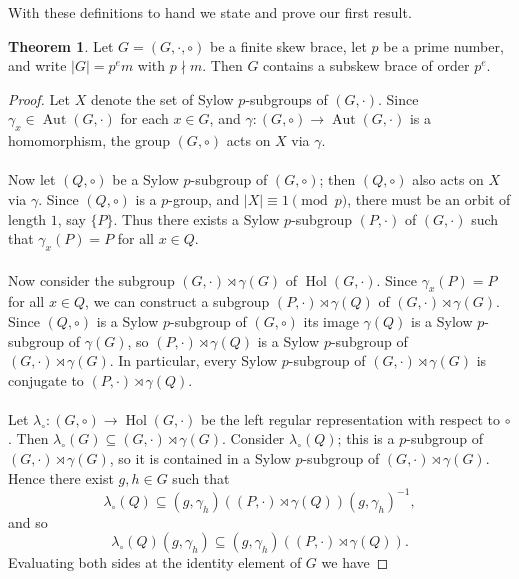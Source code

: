 \documentclass[12pt,a4paper, reqno]{amsart}
\theoremstyle{definition}
\newtheorem{theorem}{Theorem}[section]
\DeclareMathOperator{\Hol}{\mbox{Hol}}
\DeclareMathOperator{\Aut}{\mbox{Aut}}
\begin{document}
With these definitions to hand we state and prove our first result.  

\begin{theorem} \label{thm_Sylow}
Let $ G=(G,\cdot,\circ) $ be a finite skew brace, let $ p $ be a prime number, and write $ |G|=p^{e}m $ with $ p \nmid m $. Then $ G $ contains a subskew brace of order $ p^{e} $. 
\end{theorem}
\begin{proof}
Let $ X $ denote the set of Sylow $ p $-subgroups of $ (G,\cdot) $. Since $ \gamma_{x} \in \Aut(G,\cdot) $ for each $ x \in G $, and $ \gamma : (G,\circ) \rightarrow \Aut(G,\cdot) $ is a homomorphism, the group $ (G,\circ) $ acts on $ X $ via $ \gamma $. 
\\ \\
Now let $ (Q,\circ) $ be a Sylow $ p $-subgroup of $ (G,\circ) $; then $ (Q,\circ) $ also acts on $ X $ via $ \gamma $. Since $ (Q,\circ) $ is a $ p $-group, and $ |X| \equiv 1 \pmod{p} $, there must be an orbit of length $ 1 $, say $ \{ P \} $. Thus there exists a Sylow $ p $-subgroup $ (P,\cdot) $ of $ (G,\cdot) $ such that $ \gamma_{x}(P)=P $ for all $ x \in Q $. 
\\ \\
Now consider the subgroup $ (G,\cdot) \rtimes \gamma(G) $ of $ \Hol(G,\cdot) $. Since $ \gamma_{x}(P)=P $ for all $ x \in Q $, we can construct a subgroup $ (P,\cdot) \rtimes \gamma(Q) $ of $ (G,\cdot) \rtimes \gamma(G) $. Since $ (Q,\circ) $ is a Sylow $ p $-subgroup of  $ (G,\circ) $ its image $ \gamma(Q) $ is a Sylow $ p $-subgroup of $ \gamma(G) $, so $ (P,\cdot) \rtimes \gamma(Q) $ is a Sylow $ p $-subgroup of $ (G,\cdot) \rtimes \gamma(G) $. In particular, every Sylow $ p $-subgroup of $ (G,\cdot) \rtimes \gamma(G) $ is conjugate to $ (P,\cdot) \rtimes \gamma(Q) $.
\\ \\
Let $ \lambda_{\circ} : (G,\circ) \rightarrow \Hol(G,\cdot) $ be the left regular representation with respect to $ \circ $. Then $ \lambda_{\circ}(G) \subseteq (G,\cdot) \rtimes \gamma(G) $. Consider $ \lambda_{\circ}(Q) $; this is a $ p $-subgroup of $ (G,\cdot) \rtimes \gamma(G) $, so it is contained in a Sylow $ p $-subgroup of $ (G,\cdot) \rtimes \gamma(G) $. Hence there exist $ g,h \in G $ such that 
\[ \lambda_{\circ}(Q) \subseteq (g,\gamma_{h})\left( (P,\cdot) \rtimes \gamma(Q) \right) (g,\gamma_{h})^{-1}, \]
and so
\[ \lambda_{\circ}(Q) (g,\gamma_{h}) \subseteq (g,\gamma_{h})\left( (P,\cdot) \rtimes \gamma(Q) \right). \] 
Evaluating both sides at the identity element of $ G $ we have 

\end{proof}
\end{document}
